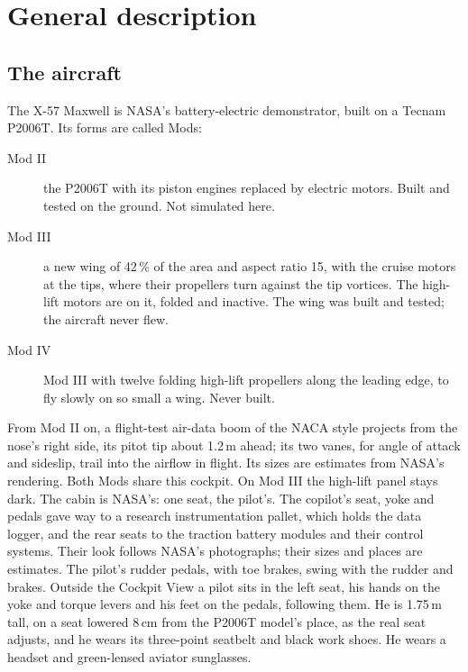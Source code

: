 \documentclass[11pt,a4paper,oneside]{book}
\begin{document}
\tableofcontents
\mainmatter

\chapter{General description}
\section{The aircraft}
The X-57 Maxwell is NASA's battery-electric demonstrator, built on a Tecnam P2006T. Its forms are called Mods:
\begin{description}
\item[Mod II] the P2006T with its piston engines replaced by electric motors. Built and tested on the ground. Not simulated here.
\item[Mod III] a new wing of 42\,\% of the area and aspect ratio 15, with the cruise motors at the tips, where their propellers turn against the tip vortices. The high-lift motors are on it, folded and inactive. The wing was built and tested; the aircraft never flew.
\item[Mod IV] Mod III with twelve folding high-lift propellers along the leading edge, to fly slowly on so small a wing. Never built.
\end{description}
From Mod II on, a flight-test air-data boom of the NACA style projects from the nose's right side, its pitot tip about 1.2\,m ahead; its two vanes, for angle of attack and sideslip, trail into the airflow in flight. Its sizes are estimates from NASA's rendering. Both Mods share this cockpit. On Mod III the high-lift panel stays dark. The cabin is NASA's: one seat, the pilot's. The copilot's seat, yoke and pedals gave way to a research instrumentation pallet, which holds the data logger, and the rear seats to the traction battery modules and their control systems. Their look follows NASA's photographs; their sizes and places are estimates. The pilot's rudder pedals, with toe brakes, swing with the rudder and brakes. Outside the Cockpit View a pilot sits in the left seat, his hands on the yoke and torque levers and his feet on the pedals, following them. He is 1.75\,m tall, on a seat lowered 8\,cm from the P2006T model's place, as the real seat adjusts, and he wears its three-point seatbelt and black work shoes. He wears a headset and green-lensed aviator sunglasses.
\end{document}
